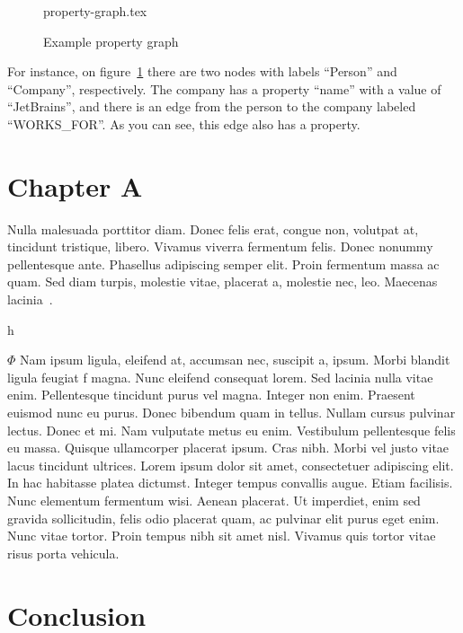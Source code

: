 \documentclass[14pt]{constructor-thesis}
\begin{document}
\begin{figure}[b]
  \centering
  
  {property-graph.tex}

  \caption{Example property graph}
  \label{fig:property-graph}
\end{figure}

For instance, on figure~\ref{fig:property-graph} there are two nodes with labels ``Person'' and ``Company'', respectively. The company has a property ``name'' with a value of ``JetBrains'', and there is an edge from the person to the company labeled ``WORKS\_FOR''. As you can see, this edge also has a property.

\section{Chapter A}
Nulla malesuada porttitor diam. Donec felis erat, congue non, volutpat at, tincidunt tristique, libero. Vivamus viverra fermentum felis. Donec nonummy pellentesque ante. Phasellus adipiscing semper elit. Proin fermentum massa ac quam. Sed diam turpis, molestie vitae, placerat a, molestie nec, leo.
Maecenas lacinia~\cite{test}.







h



$\Phi$ Nam ipsum ligula, eleifend at, accumsan nec, suscipit a, ipsum. Morbi blandit ligula feugiat f magna. Nunc eleifend consequat lorem. Sed lacinia nulla vitae enim. Pellentesque tincidunt purus vel magna. Integer non enim. Praesent euismod nunc eu purus. Donec bibendum quam in tellus. Nullam cursus pulvinar lectus. Donec et mi. Nam vulputate metus eu enim. Vestibulum pellentesque felis eu massa. Quisque ullamcorper placerat ipsum. Cras nibh. Morbi vel justo vitae lacus tincidunt ultrices. Lorem ipsum dolor sit amet, consectetuer adipiscing elit. In hac habitasse platea dictumst. Integer tempus convallis augue. Etiam facilisis. Nunc elementum fermentum wisi. Aenean placerat. Ut imperdiet, enim sed gravida sollicitudin, felis odio placerat quam, ac pulvinar elit purus eget enim. Nunc vitae tortor. Proin tempus nibh sit amet nisl. Vivamus quis tortor vitae risus porta vehicula.


\section*{Conclusion}
\lipsum[1-2]

\setmonofont[Mapping=tex-text]{CMU Typewriter Text}
% 
% 
\printbibliography
\end{document}
